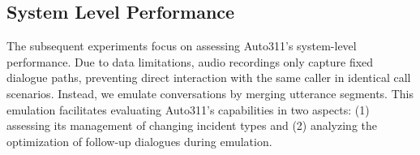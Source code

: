 
\subsection{System Level Performance}


The subsequent experiments focus on assessing Auto311's system-level performance. Due to data limitations, audio recordings only capture fixed dialogue paths, preventing direct interaction with the same caller in identical call scenarios. Instead, we emulate conversations by merging utterance segments. This emulation facilitates evaluating Auto311's capabilities in two aspects: (1) assessing its management of changing incident types and (2) analyzing the optimization of follow-up dialogues during emulation.

 



